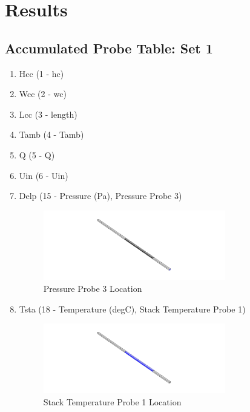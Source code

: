 \documentclass{report}
\begin{document}
        \section{Results}
            \subsection{Accumulated Probe Table: Set 1}
                \begin{enumerate}
                    \item Hcc (1 - hc)
                    \item Wcc (2 - wc)
                    \item Lcc (3 - length)
                    \item Tamb (4 - Tamb)
                    \item Q (5 - Q)
                    \item Uin (6 - Uin)
                    \item Delp (15 - Pressure (Pa), Pressure Probe 3)
                        \begin{figure}[H]
                            \centering
                            \includegraphics[width=0.75\textwidth]{00_Images/00_Pressure_Probe_3.png}
                            \caption{Pressure Probe 3 Location}
                        \end{figure}
                    \item Tsta (18 - Temperature (degC), Stack Temperature Probe 1)
                        \begin{figure}[H]
                            \centering
                            \includegraphics[width=0.75\textwidth]{00_Images/00_Stack_Temperature_Probe_1.png}
                            \caption{Stack Temperature Probe 1 Location}
                        \end{figure}
                \end{enumerate}
\end{document}
